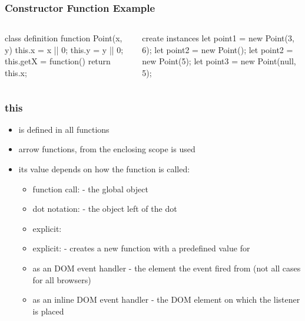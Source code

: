 \begin{frame}[fragile] \frametitle{Constructor Function Example}

\begin{columns}[onlytextwidth]
  \begin{column}{0.5\textwidth}
\begin{CodeBox}{class definition}
function Point(x, y) {
  this.x = x || 0;
  this.y = y || 0;
  this.getX = function() {
    return this.x;
  }
}
\end{CodeBox}
  \end{column}
  \begin{column}{0.5\textwidth}
\begin{CodeBox}{create instances}
let point1 = new Point(3, 6);
let point2 = new Point();
let point2 = new Point(5);
let point3 = 
  new Point(null, 5);
\end{CodeBox}
  \end{column}
\end{columns}%
\end{frame}

\begin{frame}[fragile] \frametitle{this}
\begin{itemize}
  \item {} is defined in all functions
  \item arrow functions,  from the enclosing scope is used
  \item its value depends on how the function is called:
  \begin{itemize}
    \item function call:  - the global object
    \item dot notation:  - the object left of the dot
    \item explicit: 
    \item explicit:  - creates a new function with a predefined value for 
    \item as an DOM event handler - the element the event fired from (not all cases for all browsers)
    \item as an inline DOM event handler - the DOM element on which the listener is placed
  \end{itemize}
\end{itemize}
\end{frame}


